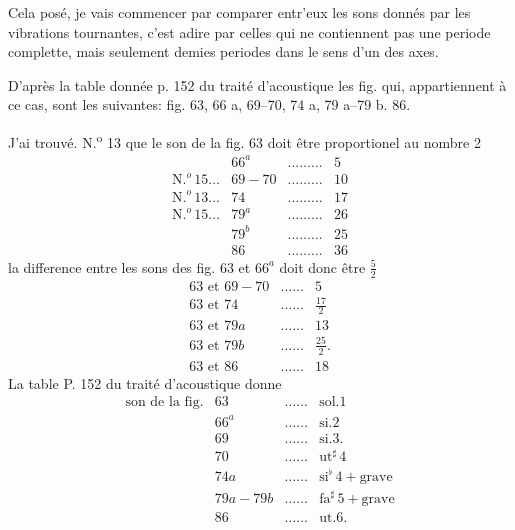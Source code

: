 \documentclass[11pt,a4paper]{article}
\begin{document}

Cela posé, je vais commencer par comparer entr'eux les sons
donnés par les vibrations tournantes, c'est adire par celles
qui ne contiennent pas une periode complette,  mais seulement
 demies periodes dans le sens d'un des axes.

D'après la table donnée p. 152 du traité d'acoustique
les fig. qui,  appartiennent à ce cas, sont les suivantes:
fig. 63, 66 a, 69--70, 74 a, 79 a--79 b. 86.

J'ai trouvé. N.\textsuperscript{o} 13 que le son de la fig. 63 doit être proportionel au nombre 2
\[ \begin{array}{llcr}
 & 66^{a} & \dots\dots\dots & 5 \\
\text{N.}^{o}\,15 \dots & 69-70 & \dots\dots\dots & 10 \\
\text{N.}^{o}\,13 \dots & 74 & \dots\dots\dots & 17 \\
\text{N.}^{o}\,15 \dots & 79^{a} & \dots\dots\dots & 26 \\
 & 79^{b} & \dots\dots\dots & 25 \\
 & 86 & \dots\dots\dots & 36
\end{array} \]
la difference entre les sons des fig. 63 et $66^{a}$ doit donc être $\frac{5}{2}$
\[ \begin{array}{lcr}
63 \text{ et } 69-70 & \dots\dots & 5 \\
63 \text{ et } 74 & \dots\dots & \frac{17}{2} \\
63 \text{ et } 79a & \dots\dots & 13 \\
63 \text{ et } 79b & \dots\dots & \frac{25}{2}. \\
63 \text{ et } 86 & \dots\dots & 18
\end{array} \]
La table P. 152 du traité d'acoustique donne
\[ \begin{array}{llcl}
\text{son de la fig.} & 63 & \dots\dots & \text{sol}.1 \\
 & 66^{a} & \dots\dots & \text{si}.2 \\
 & 69 & \dots\dots & \text{si}.3. \\
 & 70 & \dots\dots & \text{ut}^{\sharp}\,4 \\
 & 74a & \dots\dots & \text{si}^{\flat}\,4 + \text{grave} \\
 & 79a-79b & \dots\dots & \text{fa}^{\sharp}\,5 + \text{grave} \\
 & 86 & \dots\dots & \text{ut}.6.
\end{array} \]
\end{document}
